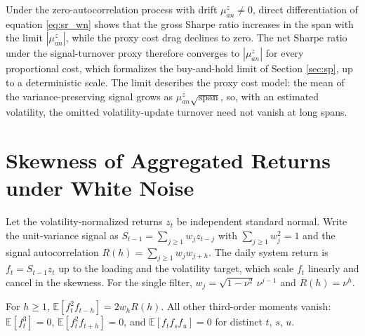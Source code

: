 \documentclass[hidelinks]{siamonline250211}
\newcommand{\spn}{\mathrm{span}}
\begin{document}
\begin{remark}\label{rem:asym_wn}
	Under the zero-autocorrelation process with drift $\mu^{z}_{an} \neq 0$, direct differentiation of equation \eqref{eq:sr_wn} shows that the gross Sharpe ratio increases in the span with the limit $|\mu^{z}_{an}|$, while the proxy cost drag declines to zero. The net Sharpe ratio under the signal-turnover proxy therefore converges to $|\mu^{z}_{an}|$ for every proportional cost, which formalizes the buy-and-hold limit of Section \ref{sec:sp}, up to a deterministic scale. The limit describes the proxy cost model: the mean of the variance-preserving signal grows as $\mu^{z}_{an}\sqrt{\spn}$, so, with an estimated volatility, the omitted volatility-update turnover need not vanish at long spans.
\end{remark}



\section{Skewness of Aggregated Returns under White Noise}\label{app:skew}

Let the volatility-normalized returns $z_{t}$ be independent standard normal. Write the unit-variance signal as $S_{t-1}=\sum_{j\geq 1}w_{j}z_{t-j}$ with $\sum_{j\geq 1}w^{2}_{j}=1$ and the signal autocorrelation $R(h)=\sum_{j\geq 1}w_{j}w_{j+h}$. The daily system return is $f_{t}=S_{t-1}z_{t}$ up to the loading and the volatility target, which scale $f_{t}$ linearly and cancel in the skewness. For the single filter, $w_{j}=\sqrt{1-\nu^{2}}\,\nu^{j-1}$ and $R(h)=\nu^{h}$.

\begin{lemma}\label{lem:skew_pair}
	For $h\geq 1$, $\mathbb{E}\left[f^{2}_{t}f_{t-h}\right]=2w_{h}R(h)$. All other third-order moments vanish: $\mathbb{E}\left[f^{3}_{t}\right]=0$, $\mathbb{E}\left[f^{2}_{t}f_{t+h}\right]=0$, and $\mathbb{E}\left[f_{t}f_{s}f_{u}\right]=0$ for distinct $t$, $s$, $u$.
\end{lemma}
\end{document}
